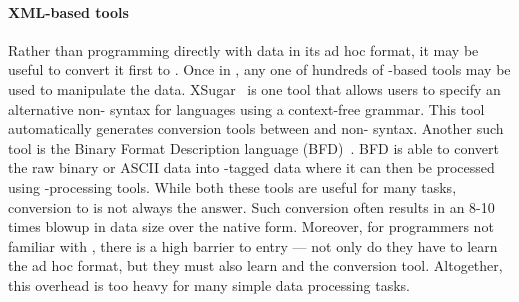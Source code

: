 



\paragraph*{XML-based tools}
Rather than programming directly with data in its ad hoc format,
it may be useful to convert it first to \xml.  Once in \xml,
any one of hundreds of \xml-based tools may be used to manipulate the data.
XSugar~\cite{brabrand+:xsugar2005} is one tool that
allows users to specify an
alternative non-\xml{} syntax for \xml{} languages using a
context-free grammar.  This tool automatically generates conversion
tools between \xml{} and non-\xml{} syntax.  Another such tool is
the Binary Format
Description language (BFD)~\cite{bfd}.  BFD is able
to convert the raw binary or ASCII 
data into \xml{}-tagged data where it can then be
processed using \xml{}-processing tools.  While both these tools are
useful for many tasks, conversion to \xml{} is not always the answer.
Such conversion often results in an 8-10 times blowup in data size
over the native form.  Moreover, for programmers not familiar with
\xml, there is a high barrier to entry --- not 
only do they have to learn the ad hoc format, 
but they must also learn \xml{} and
the \xml{} conversion tool.  Altogether, this overhead is too heavy
for many simple data processing tasks.


